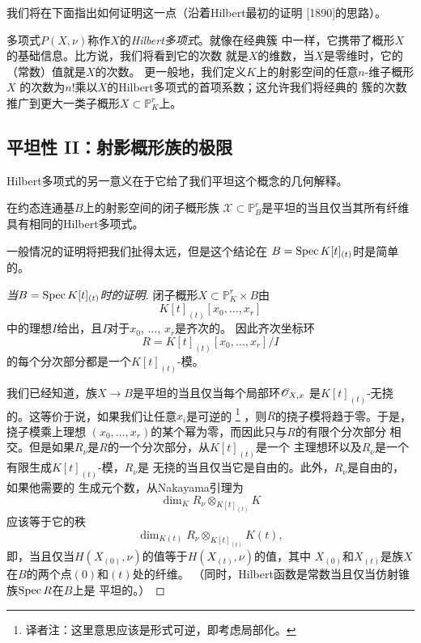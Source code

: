 我们将在下面指出如何证明这一点（沿着Hilbert最初的证明
[1890]的思路）。

多项式$P(X,\nu)$称作$X$的\textit{Hilbert多项式}。就像在经典簇
中一样，它携带了概形$X$的基础信息。比方说，我们将看到它的次数
就是$X$的维数，当$X$是零维时，它的（常数）值就是$X$的次数。
更一般地，我们定义$K$上的射影空间的任意$n$-维子概形$X$
的次数为$n!$乘以$X$的Hilbert多项式的首项系数；这允许我们将经典的
簇的次数推广到更大一类子概形$X\subset \mathbb P^r_K$上。

\subsection{平坦性 II：射影概形族的极限}\label{s:3.3.2}

Hilbert多项式的另一意义在于它给了我们平坦这个概念的几何解释。


\begin{pro}\label{pro:3.56}
在约态连通基$B$上的射影空间的闭子概形族
$\mathscr X\subset \mathbb P_B^r$是平坦的当且仅当其所有纤维
具有相同的Hilbert多项式。
\end{pro}

一般情况的证明将把我们扯得太远，但是这个结论在
$B=\operatorname{Spec} K[t]_{(t)}$时是简单的。

\begin{proof}[{当$B=\operatorname{Spec} K\lbrack t\rbrack_{(t)}$时的证明}]
闭子概形$X\subset \mathbb P_K^r\times B$由
\[
	K[t]_{(t)}[x_0,\dots,x_r]
\]
中的理想$I$给出，且$I$对于$x_0$, $\dots$, $x_r$是齐次的。
因此齐次坐标环
\[
	R=K[t]_{(t)}[x_0,\dots,x_r]/I
\]
的每个分次部分都是一个$K[t]_{(t)}$-模。

我们已经知道，族$X\to B$是平坦的当且仅当每个局部环$\mathscr{O}_{X,x}$
是$K[t]_{(t)}$-无挠的。这等价于说，如果我们让任意$x_i$是可逆的%
\footnote{译者注：这里意思应该是形式可逆，即考虑局部化。}%
，则$R$的挠子模将趋于零。于是，挠子模乘上理想
$(x_0,\dots,x_r)$的某个幂为零，而因此只与$R$的有限个分次部分
相交。但是如果$R_\nu$是$R$的一个分次部分，从$K[t]_{(t)}$是一个
主理想环以及$R_\nu$是一个有限生成$K[t]_{(t)}$-模，$R_\nu$是
无挠的当且仅当它是自由的。此外，$R_\nu$是自由的，如果他需要的
生成元个数，从Nakayama引理为
\[
	\dim_K R_\nu \otimes_{K[t]_{(t)}}K
\]
应该等于它的秩
\[
	\dim_{K(t)}R_\nu  \otimes_{K[t]_{(t)}}K(t),
\]
即，当且仅当$H(X_{(0)},\nu)$的值等于$H(X_{(t)},\nu)$的值，其中
$X_{(0)}$和$X_{(t)}$是族$X$在$B$的两个点$(0)$和$(t)$处的纤维。
（同时，Hilbert函数是常数当且仅当仿射锥族$\operatorname{Spec} R$在$B$上是
平坦的。）
\end{proof}

